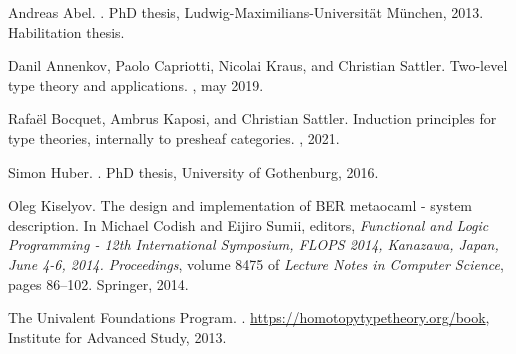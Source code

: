 \documentclass[11pt,a4paper,twoside]{article}
\newcommand{\msf}[1]{\mathsf{#1}}
\newcommand{\mi}[1]{\mathit{#1}}
\newcommand{\U}{\mathsf{U}}
\newcommand{\Code}{\mathsf{Code}}
\newcommand{\Ty}{\mathsf{Ty}}
\newcommand{\Bool}{\msf{Bool}}
\newcommand{\true}{\msf{true}}
\newcommand{\id}{\msf{id}}
\newcommand{\qtm}[1]{\langle #1\rangle}
\begin{document}
\begin{thebibliography}{1}

Andreas Abel.
.
\newblock PhD thesis, Ludwig-Maximilians-Universit{\"a}t M{\"u}nchen, 2013.
\newblock Habilitation thesis.

Danil Annenkov, Paolo Capriotti, Nicolai Kraus, and Christian Sattler.
\newblock Two-level type theory and applications.
, may 2019.

Rafa{\"e}l Bocquet, Ambrus Kaposi, and Christian Sattler.
\newblock Induction principles for type theories, internally to presheaf
  categories.
, 2021.

Simon Huber.
.
\newblock PhD thesis, University of Gothenburg, 2016.

Oleg Kiselyov.
\newblock The design and implementation of {BER} metaocaml - system
  description.
\newblock In Michael Codish and Eijiro Sumii, editors, {\em Functional and
  Logic Programming - 12th International Symposium, {FLOPS} 2014, Kanazawa,
  Japan, June 4-6, 2014. Proceedings}, volume 8475 of {\em Lecture Notes in
  Computer Science}, pages 86--102. Springer, 2014.

The {Univalent Foundations Program}.
.
\newblock \url{https://homotopytypetheory.org/book}, Institute for Advanced
  Study, 2013.
\end{thebibliography}


\let\msf\undefined
\let\mi\undefined
\let\U\undefined
\let\Code\undefined
\let\Ty\undefined
\let\Bool\undefined
\let\true\undefined
\let\id\undefined
\let\qtm\undefined

\end{document}
